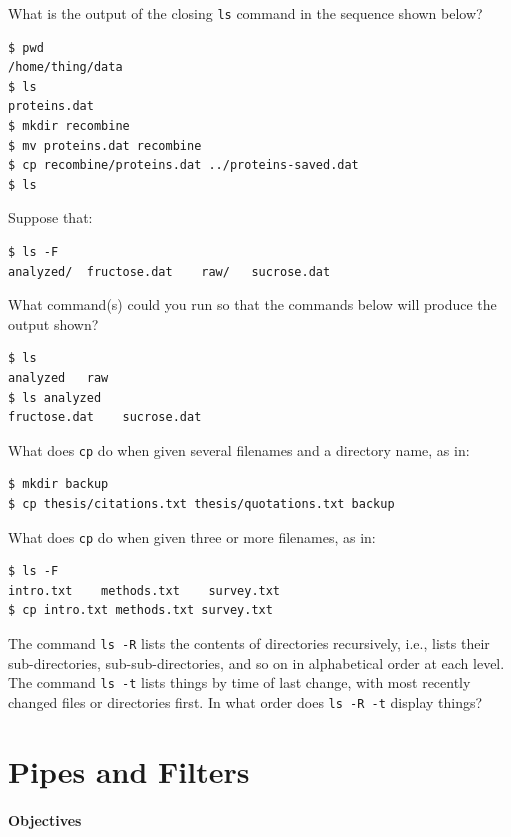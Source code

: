 \documentclass{book}
\begin{document}
\begin{swcenumerate}
\item
  What is the output of the closing \texttt{ls} command in the sequence
  shown below?

\begin{verbatim}
$ pwd
/home/thing/data
$ ls
proteins.dat
$ mkdir recombine
$ mv proteins.dat recombine
$ cp recombine/proteins.dat ../proteins-saved.dat
$ ls
\end{verbatim}
\item
  Suppose that:

\begin{verbatim}
$ ls -F
analyzed/  fructose.dat    raw/   sucrose.dat
\end{verbatim}

  What command(s) could you run so that the commands below will produce
  the output shown?

\begin{verbatim}
$ ls
analyzed   raw
$ ls analyzed
fructose.dat    sucrose.dat
\end{verbatim}
\item
  What does \texttt{cp} do when given several filenames and a directory
  name, as in:

\begin{verbatim}
$ mkdir backup
$ cp thesis/citations.txt thesis/quotations.txt backup
\end{verbatim}

  What does \texttt{cp} do when given three or more filenames, as in:

\begin{verbatim}
$ ls -F
intro.txt    methods.txt    survey.txt
$ cp intro.txt methods.txt survey.txt
\end{verbatim}
\item
  The command \texttt{ls -R} lists the contents of directories
  recursively, i.e., lists their sub-directories, sub-sub-directories,
  and so on in alphabetical order at each level. The command
  \texttt{ls -t} lists things by time of last change, with most recently
  changed files or directories first. In what order does
  \texttt{ls -R -t} display things?
\end{swcenumerate}

\section{Pipes and Filters}

\mbox{}\paragraph{Objectives}
\end{document}
